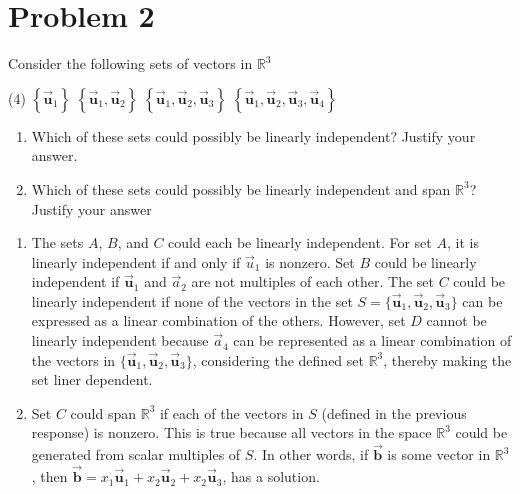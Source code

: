 \documentclass[letter,11pt]{article}
\begin{document}
\section{Problem 2}
Consider the following sets of vectors in $\mathbb{R}^{3}$
\begin{tasks}(4)
    \task $\left\{\vec{\boldsymbol{u}}_{1}\right\}$
    \task $\left\{\vec{\boldsymbol{u}}_{1}, \vec{\boldsymbol{u}}_{2}\right\}$
    \task $\left\{\vec{\boldsymbol{u}}_{1}, \vec{\boldsymbol{u}}_{2}, \vec{\boldsymbol{u}}_{3}\right\}$
    \task $\left\{\vec{\boldsymbol{u}}_{1}, \vec{\boldsymbol{u}}_{2}, \vec{\boldsymbol{u}}_{3}, \vec{\boldsymbol{u}}_{4}\right\}$
\end{tasks}

\begin{enumerate}[label = \roman*.]
    \item Which of these sets could possibly be linearly independent? Justify your answer.
    \item Which of these sets could possibly be linearly independent and span $\mathbb{R}^{3}$? Justify your answer
\end{enumerate}

\begin{tcolorbox}[boxrule=1mm, width=(.9\linewidth),before=\hfill,after=\hfill,adjusted title={Problem \# 2 Solutions}]
    \begin{enumerate}[label = \roman*.]
        \item  The sets \( A \), \( B \), and \( C \) could each be linearly independent.  For set \( A \), it is linearly independent if and only if \( \vec{u}_1 \) is nonzero. Set \( B \) could be linearly independent if \( \vec{\boldsymbol{u}}_1 \) and \( \vec{a}_2 \) are not multiples of each other. The set \( C \) could be linearly independent if none of the vectors in the set \( S = \{ \vec{\boldsymbol{u}}_1, \vec{\boldsymbol{u}}_2, \vec{\boldsymbol{u}}_3 \} \) can be expressed as a linear combination of the others. However, set \( D \) cannot be linearly independent because \( \vec{a}_4 \) can be represented as a linear combination of the vectors in \( \{ \vec{\boldsymbol{u}}_1, \vec{\boldsymbol{u}}_2, \vec{\boldsymbol{u}}_3 \} \), considering the defined set \( \mathbb{R}^3 \), thereby making the set liner dependent.
        \item Set \( C \) could span \( \mathbb{R}^3 \) if each of the vectors in \( S \) (defined in the previous response) is nonzero. This is true because all vectors in the space \( \mathbb{R}^3 \) could be generated from scalar multiples of \( S \). In other words, if $\vec{\boldsymbol{b}}$ is some vector in $\mathbb{R}^3$, then $\vec{\boldsymbol{b}} = x_{1} \vec{\boldsymbol{u}}_1+x_{2} \vec{\boldsymbol{u}}_2+ x_{2} \vec{\boldsymbol{u}}_3$, has a solution. 
    \end{enumerate}
\end{tcolorbox}
\newpage
\end{document}
